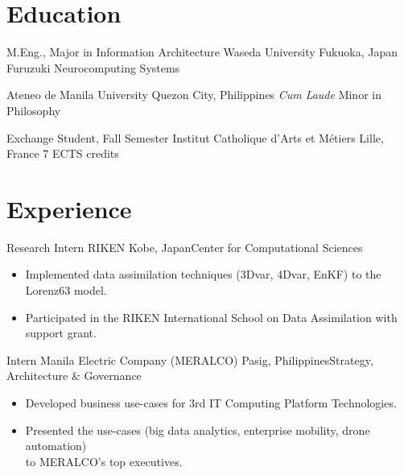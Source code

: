 \documentclass[11pt,a4paper,sans]{moderncv}
\begin{document}
\maketitle


\section{Education}
        {M.Eng., Major in Information Architecture}
        {Waseda University}
        {Fukuoka, Japan}{}
        {Furuzuki Neurocomputing Systems}

        {Ateneo de Manila University}
        {Quezon City, Philippines}
        {\textit{Cum Laude}}
        {Minor in Philosophy}

        {Exchange Student, Fall Semester}
        {Institut Catholique d'Arts et M\'etiers}
        {Lille, France}{}
        {7 ECTS credits}

\section{Experience}

        {Research Intern}
        {RIKEN}
        {Kobe, Japan}{Center for Computational Sciences}
        {
            \begin{itemize}
                \item Implemented data assimilation techniques (3Dvar, 4Dvar, EnKF) to the Lorenz63 model.
                \item Participated in the RIKEN International School on Data Assimilation with support grant.
            \end{itemize}
        }

        {Intern}
        {Manila Electric Company (MERALCO)}
        {Pasig, Philippines}{Strategy, Architecture \& Governance}
        {
            \begin{itemize}
                \item Developed business use-cases for 3rd IT Computing Platform Technologies.
                \item Presented the use-cases (big data analytics, enterprise mobility, drone automation)\\ to MERALCO's top executives.
            \end{itemize}
        }
\end{document}
